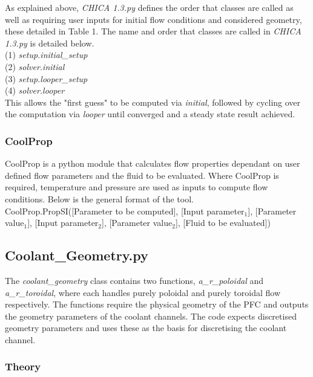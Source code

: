 \documentclass{article}
\begin{document}
As explained above, \textit{CHICA 1.3.py} defines the order that classes are called as well as requiring user inputs for initial flow conditions and considered geometry, these detailed in Table 1. The name and order that classes are called in \textit{CHICA 1.3.py} is detailed below.\\

(1) \textit{setup.initial\_setup} \\

(2) \textit{solver.initial} \\

(3) \textit{setup.looper\_setup} \\

(4) \textit{solver.looper} \\

This allows the "first guess" to be computed via \textit{initial}, followed by cycling over the computation via \textit{looper} until converged and a steady state result achieved. 

\subsubsection{CoolProp}

CoolProp is a python module that calculates flow properties dependant on user defined flow parameters and the fluid to be evaluated. Where CoolProp is required, temperature and pressure are used as inputs to compute flow conditions. Below is the general format of the tool.\\

CoolProp.PropSI([Parameter to be computed], [Input parameter$_{1}$], [Parameter value$_{1}$], [Input parameter$_{2}$], [Parameter value$_{2}$], [Fluid to be evaluated])

\subsection{Coolant\_Geometry.py}

The \textit{coolant\_geometry} class contains two functions, \textit{a\_r\_poloidal} and \textit{a\_r\_toroidal}, where each handles purely poloidal and purely toroidal flow respectively. The functions require the physical geometry of the PFC and outputs the geometry parameters of the coolant channels. The code expects discretised geometry parameters and uses these as the basis for discretising the coolant channel.  

\subsubsection{Theory}
\end{document}
